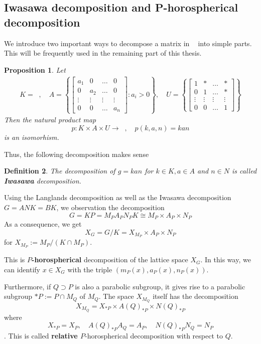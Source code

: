 \documentclass[12pt]{article} %
\newtheorem{definition}{Definition}[section]
\newtheorem{prop}[definition]{Proposition}
\DeclareMathOperator{\GLn}{\text{GL}_n(\mathbb{R})}
\DeclareMathOperator{\On}{O_n(\mathbb{R})}
\begin{document}
\subsection{Iwasawa decomposition and P-horospherical decomposition}
We introduce two important ways to decompose a matrix in $\GLn$ into simple parts. This will be frequently used
in the remaining part of this thesis.
\begin{prop}
Let \begin{align*}
K=\On, \quad A = \left\lbrace\begin{bmatrix}
    a_1    & 0      & \ldots & 0      \\
    0      & a_2    & \ldots & 0      \\
    \vdots & \vdots & \vdots & \vdots \\
    0      & 0      & \ldots & a_n
\end{bmatrix}: a_i >0\right\rbrace, \quad
U = \left\lbrace  \begin{bmatrix}
    1      & \ast   & \ldots & \ast           \\
    0      & 1      & \ldots & \ast           \\
    \vdots & \vdots & \vdots & \vdots         \\
    0      & 0      & \ldots & 1\end{bmatrix}
\right\rbrace
    \end{align*}
Then the natural product map \[p \colon K \times A \times U \to \GLn, \quad p(k,a,n)=kan\]
is an isomorhism.
\end{prop}
Thus, the following decomposition makes sense 
\begin{definition}
    The decomposition of $g = kan$ for $k \in K, a \in A$ and $n \in N$ is called \textbf{Iwasawa} decomposition.
\end{definition}
Using the Langlands decomposition as well as the Iwasawa decomposition $G= ANK = BK$, we observation
the decomposition
\[G = KP = M_PA_PN_PK \cong M_P \times A_P \times N_P\]
As a consequence, we get
\[X_G  = G/K = X_{M_P} \times A_P \times N_P\]
for $X_{M_P} := M_{P}/(K\cap M_P)$. 

This is \textbf{ $P$-horospherical} decomposition of the lattice space $X_G$. In this way,
we can identify  $x \in X_G$ with the triple $(m_P(x), a_P(x),n_P(x))$. 

Furthermore, if $Q\supset P$ is also a parabolic subgroup, it gives rise to a parabolic subgroup $\ast P := P \cap M_Q$ of $M_Q$.
The space $X_{M_Q}$ itself has the decomposition
\[X_{M_Q} = X_{\ast P} \times A(Q)_{\ast P} \times N(Q)_{\ast P}\]
where $$ X_{\ast P} = X_P, \quad A(Q)_{\ast P}A_Q=A_P, \quad N(Q)_{\ast P}N_Q=N_P$$. This is called \textbf{relative $P$}-horospherical decomposition with respect to $Q$.  
\end{document}
